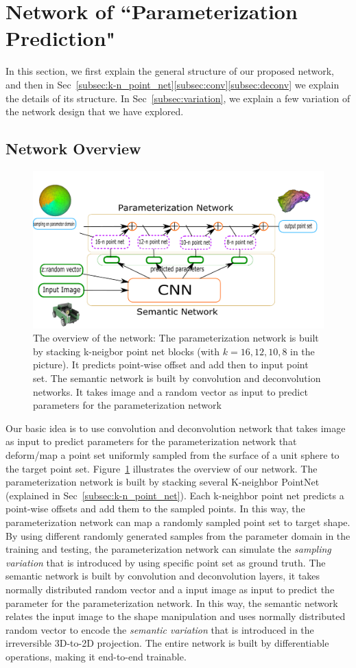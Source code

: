 \section{Network of ``Parameterization Prediction"}
In this section, we first explain the general structure of our proposed network, and then in Sec~\ref{subsec:k-n_point_net}\ref{subsec:conv}\ref{subsec:deconv} we explain the details of its structure. In Sec~\ref{subsec:variation}, we explain a few variation of the network design that we have explored.
\subsection{Network Overview}
\begin{figure}[htbp]
	\centering
	\includegraphics[width=\linewidth]{img/net/overview}
	\caption{The overview of the network: The parameterization network is built by stacking k-neigbor point net blocks (with $k=16,12,10,8$ in the picture). It predicts point-wise offset and add then to input point set. The semantic network is built by convolution and deconvolution networks. It takes image and a random vector as input to predict parameters for the parameterization network}
	\label{fig:overview}
\end{figure}
Our basic idea is to use convolution and deconvolution network that takes image as input to predict parameters for the parameterization network that deform/map a point set uniformly sampled from the surface of a unit sphere to the target point set. Figure~\ref{fig:overview} illustrates the overview of our network. The parameterization network is built by stacking several K-neighbor PointNet (explained in Sec~\ref{subsec:k-n_point_net}). Each k-neighbor point net predicts a point-wise offsets and add them to the sampled points. In this way, the parameterization network can map a randomly sampled point set to target shape. By using different randomly generated samples from the parameter domain in the training and testing, the parameterization network can simulate the \textit{sampling variation} that is introduced by using specific point set as ground truth. The semantic network is built by convolution and deconvolution layers, it takes normally distributed random vector and a input image as input to predict the parameter for the parameterization network. In this way, the semantic network relates the input image to the shape manipulation and uses normally distributed random vector to encode the \textit{semantic variation} that is introduced in the irreversible 3D-to-2D projection. The entire network is built by differentiable operations, making it end-to-end trainable.
